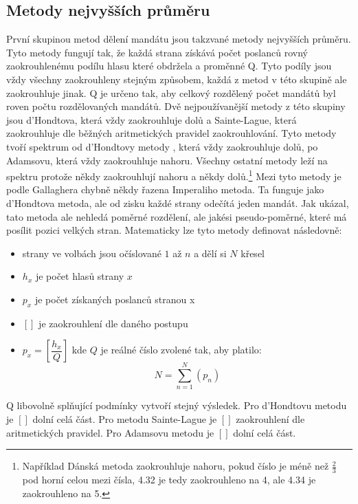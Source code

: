 \documentclass[12pt]{report}
\begin{document}
\subsection{Metody nejvyšších průměru} První skupinou metod dělení mandátu jsou takzvané metody nejvyšších průměru.
Tyto metody fungují tak, že každá strana získává počet poslanců rovný zaokrouhlenému podílu hlasu které obdržela a proměnné Q.
Tyto podíly jsou vždy všechny zaokrouhleny stejným způsobem, každá z metod v této skupině ale zaokrouhluje jinak.
Q je určeno tak, aby celkový rozdělený počet mandátů byl roven počtu rozdělovaných mandátů.
Dvě nejpoužívanější metody z této skupiny jsou d'Hondtova, která vždy zaokrouhluje dolů a Sainte-Lague, která zaokrouhluje dle běžných aritmetických pravidel zaokrouhlování.
Tyto metody tvoří spektrum od d'Hondtovy metody , která vždy zaokrouhluje dolů, po Adamsovu, která vždy zaokrouhluje nahoru.
Všechny ostatní metody leží na spektru protože někdy zaokrouhlují nahoru a někdy dolů.\footnote{Například Dánská metoda zaokrouhluje nahoru, pokud číslo je méně než $\frac{2}{3}$ pod horní celou mezi čísla, 4.32 je tedy zaokrouhleno na 4, ale 4.34 je zaokrouhleno na 5.} Mezi tyto metody je podle Gallaghera chybně někdy řazena Imperaliho metoda.
Ta funguje jako d'Hondtova metoda, ale od zisku každé strany odečítá jeden mandát.
Jak ukázal, tato metoda ale nehledá poměrné rozdělení, ale jakési pseudo-poměrné, které má posílit pozici velkých stran.\autocite{GAL1}
\newpage
Matematicky lze tyto metody definovat následovně: 
\begin{itemize}
\item strany ve volbách jsou očíslované $1$ až $n$ a dělí si $N$ křesel
\item $h_{x}$ je počet hlasů strany $x$ \item $p_{x}$ je počet získaných poslanců stranou x
\item $[ ]$ je zaokrouhlení dle daného postupu
\item $p_{x}=[\dfrac{h_{x}}{Q}]$ kde $Q$ je reálné číslo zvolené tak, aby platilo: $$N=\sum_{n=1}^{N} (p_{n})$$
\end{itemize}
Q libovolně splňující podmínky vytvoří stejný výsledek.\autocite{GAL1}
Pro d'Hondtovu metodu je $[ ]$ dolní celá část.
Pro metodu Sainte-Lague je $[ ]$ zaokrouhlení dle aritmetických pravidel.
Pro Adamsovu metodu je $[ ]$ dolní celá část.
\end{document}
